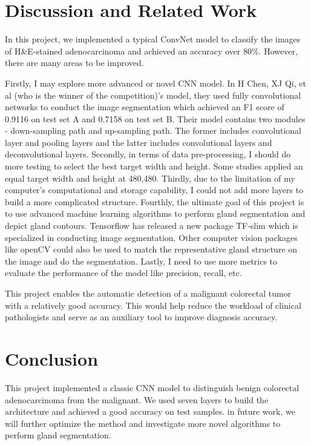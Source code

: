 \documentclass[twoside,11pt]{article}
\begin{document}
\newpage
\section{Discussion and Related Work} 
In this project, we implemented a typical ConvNet model to classify the images of H&E-stained adenocarcinoma and achieved an accuracy over 80\%. However, there are many areas to be improved. 

Firstly, I may explore more advanced or novel CNN model. In H Chen, XJ Qi, et al \citep{9} (who is the winner of the competition)'s model, they used fully convolutional networks to conduct the image segmentation which achieved an F1 score of 0.9116 on test set A and 0.7158 on test set B. Their model contains two modules - down-sampling path and up-sampling path. The former includes convolutional layer and pooling layers and the latter includes convolutional layers and deconvolutional layers. 
Secondly, in terms of data pre-processing, I should do more testing to select the best target width and height. Some studies applied an equal target width and height at 480,480. 
Thirdly, due to the limitation of my computer's computational and storage capability, I could not add more layers to build a more complicated structure. Fourthly, the ultimate goal of this project is to use advanced machine learning algorithms to perform gland segmentation and depict gland contours. Tensorflow has released a new package TF-slim which is specialized in conducting image segmentation. Other computer vision packages like openCV could also be used to match the representative gland structure on the image and do the segmentation. Lastly, I need to use more metrics to evaluate the performance of the model like precision, recall, etc.

This project enables the automatic detection of a malignant colorectal tumor with a relatively good accuracy. This would help reduce the workload of clinical pathologists and serve as an auxiliary tool to improve diagnosis accuracy. 

\section{Conclusion} 
This project implemented a classic CNN model to distinguish benign colorectal adenocarcinoma from the malignant. We used seven layers to build the architecture and achieved a good accuracy on test samples. in future work, we will further optimize the method and investigate more novel algorithms to perform gland segmentation. 
\end{document}

